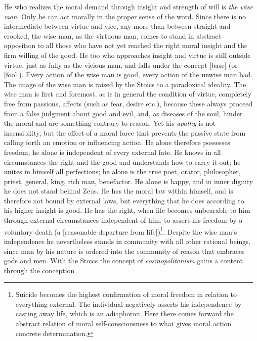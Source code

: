 He who realizes the moral demand through insight and strength of will is
\emph{the wise man}. Only he can act morally in the proper sense of the
word. Since there is no intermediate between virtue and vice, any more
than between straight and crooked, the wise man, as the virtuous man,
comes to stand in abstract opposition to all those who have not yet
reached the right moral insight and the firm willing of the good. He too
who approaches insight and virtue is still outside virtue,
just as fully as the vicious man, and falls under the concept
 [base] (or  [fool]). Every action of the wise man
is good, every action of the unwise man bad. The image of the wise man is
raised by the Stoics to a paradoxical ideality. The wise man is first and
foremost, as is in general the condition of virtue,
 \setcounter{footnote}{0}
completely free from passions, affects (such as fear, desire etc.),
because these always proceed from a false judgment about good and evil,
and, as diseases of the soul, hinder the moral and are something contrary
to reason. Yet his \emph{apathy} is not insensibility, but the effect of
a moral force that prevents the passive state from calling forth an
emotion or influencing action. He alone therefore possesses freedom; he
alone is independent of every external fate. He knows in all
circumstances the right and the good and understands how to carry it
out; he unites in himself all perfections; he alone is the true poet,
orator, philosopher, priest, general, king, rich man, benefactor. He
alone is happy, and in inner dignity he does not stand behind Zeus. He
has the moral law within himself, and is therefore not bound by external
laws, but everything that he does according to his higher insight is
good. He has the right, when life becomes unbearable to him through
external circumstances independent of him, to assert his freedom by a
voluntary death (a  [reasonable departure
from life])\footnote{Suicide becomes the highest confirmation of moral
freedom in relation to everything external. The individual negatively
asserts his independence by casting away life, which is an adiaphoron.
Here there comes forward the abstract relation of moral
self-consciousness to what gives moral action concrete determination.}.
Despite the wise man's independence he nevertheless stands in community
with all other rational beings, since man by his nature is ordered into
the community of reason that embraces gods and men. With the Stoics the
concept of \emph{cosmopolitanism} gains a content through the conception
